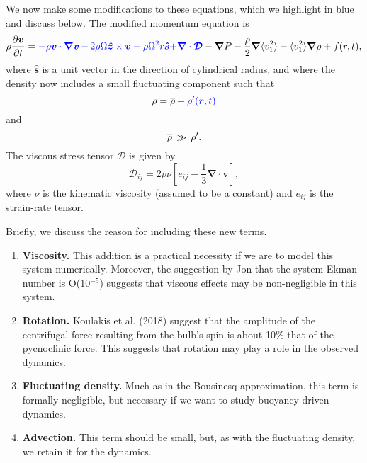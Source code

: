 We now make some modifications to these equations, which we highlight in blue and discuss below.  The modified momentum equation is
\begin{equation}
    \rho\frac{ \partial \vvec }{\partial t}   =  {\color{blue} - \rho\vvec\cdot\boldsymbol{\nabla}\vvec}
    {\color{blue} \,-\, 2\rho\Omega\boldsymbol{\hat{z}}\times\vvec  + \rho\Omega^2r\boldsymbol{\hat{s}}}
    {\color{blue} + \boldsymbol{\nabla}\cdot\boldsymbol{\mathcal{D}}}
    -\boldsymbol{\nabla}P  %
						            - \frac{\rho}{2}\boldsymbol{\nabla}\langle v_1^2\rangle
							    - \langle v_1^2\rangle\boldsymbol{\nabla}\rho
							    + f(r,t),
\end{equation}
where $\boldsymbol{\hat{s}}$ is a unit vector in the direction of cylindrical radius, and where the density now includes a small fluctuating component such that
\begin{equation}
\rho = \overline{\rho} +{\color{blue} \rho'(\boldsymbol{r},t)}
\end{equation}
and
\begin{equation}
\overline{\rho} \,\gg\, \rho'.
\end{equation}
The viscous stress tensor $\boldsymbol{\mathcal{D}}$ is given by
\begin{equation}
\mathcal{D}_{ij} = 2\rho\nu\left[e_{ij}-\frac{1}{3}\boldsymbol{\nabla}\cdot\boldsymbol{v}\right],
\end{equation}
where $\nu$ is the kinematic viscosity (assumed to be a constant) and $e_{ij}$ is the strain-rate tensor.  

Briefly, we discuss the reason for including these new terms.
\begin{enumerate}
\item {\bf Viscosity. }  This addition is a practical necessity if we are to model this system numerically.  Moreover, the suggestion by Jon that the system Ekman number is O(10$^{-5}$) suggests that viscous effects may be non-negligible in this system.
\item {\bf Rotation. }  Koulakis et al. (2018) suggest that the amplitude of the centrifugal force resulting from the bulb's spin is about 10\% that of the pycnoclinic force.   This suggests that rotation may play a role in the observed dynamics.
\item {\bf Fluctuating density.}  Much as in the Bousinesq approximation, this term is formally negligible, but necessary if we want to study buoyancy-driven dynamics.  
\item {\bf Advection. }  This term should be small, but, as with the fluctuating density, we retain it for the dynamics. 
\end{enumerate}

